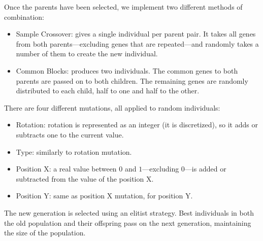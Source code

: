 \documentclass[runningheads,a4paper]{llncs}
\begin{document}
Once the parents have been selected, we implement two different methods of 
combination:
\begin{itemize}
	\item Sample Crossover: gives a single individual per parent pair. It takes 
	all genes from both parents---excluding genes that are repeated---and 
	randomly takes a number of them to create the new individual.%
	\item Common Blocks: produces two individuals. The common genes to both 
	parents are passed on to both children. The remaining genes are randomly 
	distributed to each child, half to one and half to the other. 
	\label{ga:cross2}
\end{itemize}
There are four different mutations, all applied to random individuals:
\begin{itemize}
	\item Rotation: rotation is represented as an integer (it is discretized), 
	so it adds or subtracts one to the current value. %
	\item Type: similarly to rotation mutation.
	\item Position X: a real value between $0$ and $1$---excluding $0$---is 
	added or subtracted from the value of the position X.
	\item Position Y: same as position X mutation, for position Y.
\end{itemize}
The new generation is selected using an elitist strategy. Best individuals in 
both the old population and their offspring pass on the next generation, 
maintaining the size of the population.



\end{document}
